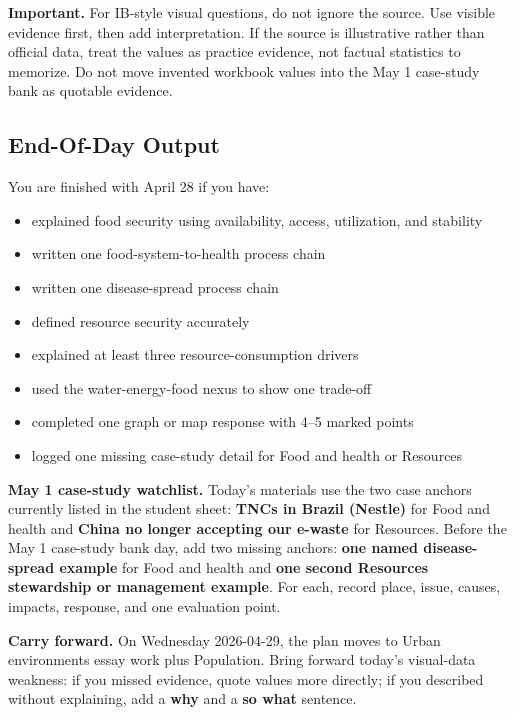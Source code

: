 \documentclass[11pt,a4paper]{article}
\newcommand{\term}[1]{\textcolor{HeadingBlue}{\textbf{#1}}}
\newcommand{\boxnote}[3]{%
\noindent\colorbox{#1}{%
  \begin{minipage}{0.965\textwidth}
  \sffamily
  \textbf{\textcolor{HeadingBlue}{#2}} #3
  \end{minipage}
}}
\begin{document}
\boxnote{SoftRed}{Important.}{For IB-style visual questions, do not ignore the
source. Use visible evidence first, then add interpretation. If the source is
illustrative rather than official data, treat the values as practice evidence,
not factual statistics to memorize. Do not move invented workbook values into
the May 1 case-study bank as quotable evidence.}

\subsection{End-Of-Day Output}

You are finished with April 28 if you have:

\begin{itemize}
  \item explained food security using availability, access, utilization, and
  stability
  \item written one food-system-to-health process chain
  \item written one disease-spread process chain
  \item defined resource security accurately
  \item explained at least three resource-consumption drivers
  \item used the water-energy-food nexus to show one trade-off
  \item completed one graph or map response with 4--5 marked points
  \item logged one missing case-study detail for Food and health or Resources
\end{itemize}

\boxnote{SoftTint}{May 1 case-study watchlist.}{Today's materials use the two
case anchors currently listed in the student sheet: \term{TNCs in Brazil
(Nestle)} for Food and health and \term{China no longer accepting our e-waste}
for Resources. Before the May 1 case-study bank day, add two missing anchors:
\term{one named disease-spread example} for Food and health and
\term{one second Resources stewardship or management example}. For each, record
place, issue, causes, impacts, response, and one evaluation point.}

\boxnote{SoftGreen}{Carry forward.}{On Wednesday 2026-04-29, the plan moves to
Urban environments essay work plus Population. Bring forward today's visual-data
weakness: if you missed evidence, quote values more directly; if you described
without explaining, add a \term{why} and a \term{so what} sentence.}
\end{document}
